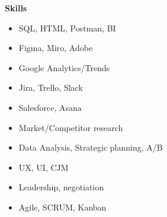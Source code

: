 \documentclass[letterpaper,11pt]{article}
\begin{document}
\textbf{Skills}
\begin{multicols}{2}
\begin{itemize}[itemsep=-5pt]
    \item SQL, HTML, Postman, BI 
    \item Figma, Miro, Adobe 
    \item Google Analytics/Trends 
    \item Jira, Trello, Slack 
    \item Salesforce, Asana 
\end{itemize}
\begin{itemize}[itemsep=-5pt]
    \item Market/Competitor research
    \item Data Analysis, Strategic planning, A/B
    \item UX, UI, CJM
    \item Leadership, negotiation
    \item Agile, SCRUM, Kanban
\end{itemize}
\end{multicols}


\end{document}
